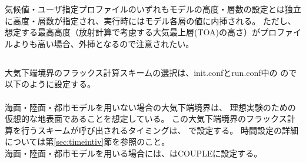 気候値・ユーザ指定プロファイルのいずれもモデルの高度・層数の設定とは独立に高度・層数が指定され、実行時にはモデル各層の値に内挿される。
ただし、想定する最高高度（放射計算で考慮する大気最上層(TOA)の高さ）がプロファイルよりも高い場合、外挿となるので注意されたい。\\



\subsection{\SubsecSurfaceSetting} \label{subsec:basic_usel_surface}
大気下端境界のフラックス計算スキームの選択は、init.confとrun.conf中の
ので以下のように設定する。\\

\\


海面・陸面・都市モデルを用いない場合の大気下端境界は、
理想実験のための仮想的な地表面であることを想定している。
この大気下端境界のフラックス計算を行うスキームが呼び出されるタイミングは、
で設定する。
時間設定の詳細については第\ref{sec:timeintiv}節を参照のこと。\\

海面・陸面・都市モデルを用いる場合には、はCOUPLEに設定する。


